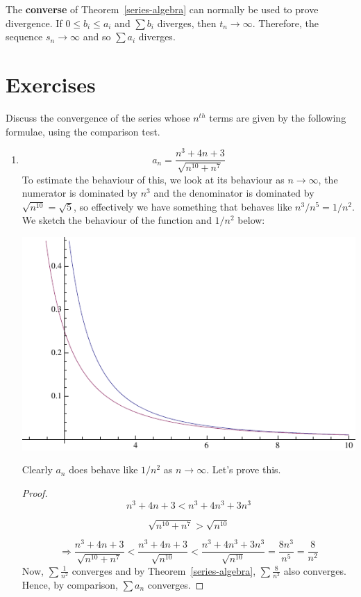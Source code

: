 \documentclass[12pt]{scrbook}
\begin{document}
The {\bf converse} of Theorem~\ref{series-algebra} can normally be used to prove divergence.  If $0 \le b_i \le a_i$ and 
$\sum b_i$ diverges, then $t_n \rightarrow \infty$.  Therefore, the sequence $s_n \rightarrow \infty$ and so
$\sum a_i$ diverges.  

\section{Exercises}
Discuss the convergence of the series whose $n^{th}$ terms are given by the following formulae, using the comparison test.

\begin{enumerate}
\item 
\[ a_n = \frac{n^3 + 4n+ 3}{\sqrt{n^{10} + n^7}} \]
To estimate the behaviour of this, we look at its behaviour as $n \rightarrow \infty$, the numerator is dominated by $n^3$ and the denominator is dominated by $\sqrt{n^{10}} = \sqrt{5}$, so effectively we have something that behaves like $n^3/n^5 = 1/n^2$.   We sketch the behaviour of
the function and $1/n^2$ below:

\includegraphics{series-comp-1.pdf}

Clearly $a_n$ does behave like $1/n^2$ as $n \rightarrow \infty$.  Let's prove this.
\begin{proof}
\[ n^3 + 4n + 3 < n^3 + 4n^3 + 3n^3 \]

\[ \sqrt{n^{10} + n^7} > \sqrt{n^{10}} \]

\[ \Rightarrow \frac{n^3 + 4n+3}{\sqrt{n^{10} + n^7}} < \frac{n^3 + 4n + 3}{\sqrt{n^{10}}} 
< \frac{n^3 + 4n^3 + 3n^3}{\sqrt{n^{10}}} = \frac{8n^3}{n^5} = \frac{8}{n^2} \]
Now, $\sum \frac{1}{n^2}$ converges and by Theorem~\ref{series-algebra}, $\sum \frac{8}{n^2}$ also converges.
Hence, by comparison, $\sum a_n$ converges.
\end{proof}


\end{enumerate}
\end{document}
